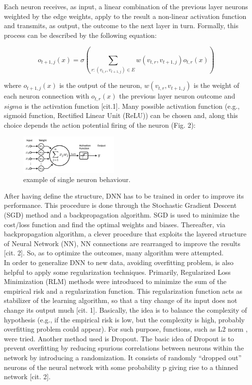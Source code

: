 \documentclass[prl,twocolumn]{revtex4-1}
\begin{document}
Each neuron receives, as input, a linear combination of the previous layer neurons weighted by the edge weights, apply to the result a non-linear activation function and transmits, as output, the outcome to the next layer in turn. Formally, this process can be described by the following equation:

\begin{equation}
o_{t+1,j}(x) = \sigma \left(\sum_{r:(v_{t,r}, v_{t+1,j}) \in E}w(v_{t,r}, v_{t+1,j})o_{t,r}(x)\right)
\label{eq:simple}
\end{equation}

where \(o_{t+1,j}(x)\) is the output of the neuron, \(w(v_{t,r}, v_{t+1,j})\) is the weight of each neuron connection with \(o_{t,r}(x)\) the previous layer neuron outcome and \(sigma\) is the activation function [cit.1]. Many possible activation function (e.g., sigmoid function, Rectified Linear Unit (ReLU)) can be chosen and, along this choice depends the action potential firing of the neuron (Fig. 2):

\begin{figure}[h]
	\includegraphics[width=0.44\textwidth]{Activation.png}
	\caption{example of single neuron behaviour.}
	\label{fig:y}
\end{figure}

After having define the structure, DNN has to be trained in order to improve its performance.  This procedure is done through the Stochastic Gradient Descent (SGD) method and a backpropagation algorithm. SGD is used to minimize the cost/loss function and find the optimal weights and biases. Thereafter, via backpropagation algorithm, a clever procedure that exploits the layered structure of Neural Network (NN), NN connections are rearranged to improve the results [cit. 2]. So, as to optimize the outcomes, many algorithm were attempted. \\
In order to generalize DNN to new data, avoiding overfitting problem, is also helpful to apply some regularization techniques. Primarily, Regularized Loss Minimization (RLM) methods were introduced to minimize the sum of the empirical risk and a regularization function. This regularization function acts as stabilizer of the learning algorithm, so that a tiny change of its input does not change its output much [cit. 1]. Basically, the idea is to balance the complexity of hypothesis (e.g., if the empirical risk is low, but the complexity is high, probably overfitting problem could appear). For such purpose, functions, such as L2 norm , were tried. Another method used is Dropout. The basic idea of Dropout is to prevent overfitting by reducing spurious correlations between neurons within the network by introducing a randomization. It consists of randomly “dropped out” neurons of the neural network with some probability p giving rise to a thinned network [cit. 2]. \\
\end{document}
